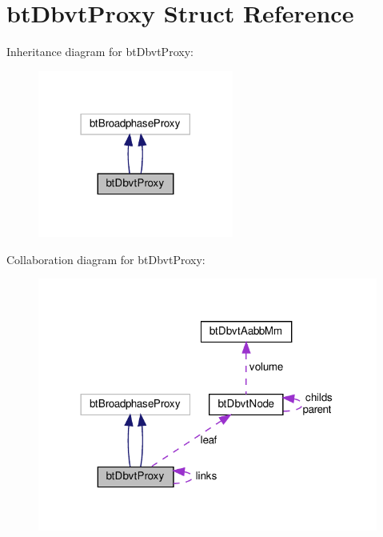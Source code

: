 \hypertarget{structbtDbvtProxy}{}\section{bt\+Dbvt\+Proxy Struct Reference}
\label{structbtDbvtProxy}


Inheritance diagram for bt\+Dbvt\+Proxy\+:
\nopagebreak
\begin{figure}[H]
\begin{center}
\leavevmode
\includegraphics[width=182pt]{structbtDbvtProxy__inherit__graph}
\end{center}
\end{figure}


Collaboration diagram for bt\+Dbvt\+Proxy\+:
\nopagebreak
\begin{figure}[H]
\begin{center}
\leavevmode
\includegraphics[width=317pt]{structbtDbvtProxy__coll__graph}
\end{center}
\end{figure}
